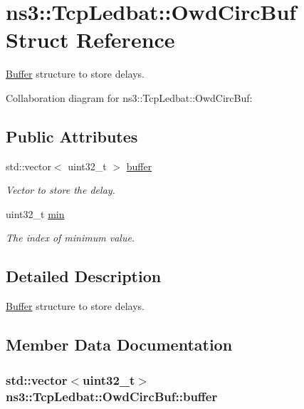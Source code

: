 \hypertarget{structns3_1_1TcpLedbat_1_1OwdCircBuf}{}\section{ns3\+:\+:Tcp\+Ledbat\+:\+:Owd\+Circ\+Buf Struct Reference}
\label{structns3_1_1TcpLedbat_1_1OwdCircBuf}


\hyperlink{classns3_1_1Buffer}{Buffer} structure to store delays.  




Collaboration diagram for ns3\+:\+:Tcp\+Ledbat\+:\+:Owd\+Circ\+Buf\+:
\subsection*{Public Attributes}
\begin{DoxyCompactItemize}
\item 
std\+::vector$<$ uint32\+\_\+t $>$ \hyperlink{structns3_1_1TcpLedbat_1_1OwdCircBuf_aa47cb47a908dc8c38286d7b6dea286af}{buffer}
\begin{DoxyCompactList}\small\item\em Vector to store the delay. \end{DoxyCompactList}\item 
uint32\+\_\+t \hyperlink{structns3_1_1TcpLedbat_1_1OwdCircBuf_a2ca25f4c2bd8afb4cf7ec19f3e74e14d}{min}
\begin{DoxyCompactList}\small\item\em The index of minimum value. \end{DoxyCompactList}\end{DoxyCompactItemize}


\subsection{Detailed Description}
\hyperlink{classns3_1_1Buffer}{Buffer} structure to store delays. 

\subsection{Member Data Documentation}
\subsubsection[{\texorpdfstring{buffer}{buffer}}]{\setlength{\rightskip}{0pt plus 5cm}std\+::vector$<$uint32\+\_\+t$>$ ns3\+::\+Tcp\+Ledbat\+::\+Owd\+Circ\+Buf\+::buffer}\hypertarget{structns3_1_1TcpLedbat_1_1OwdCircBuf_aa47cb47a908dc8c38286d7b6dea286af}{}\label{structns3_1_1TcpLedbat_1_1OwdCircBuf_aa47cb47a908dc8c38286d7b6dea286af}


